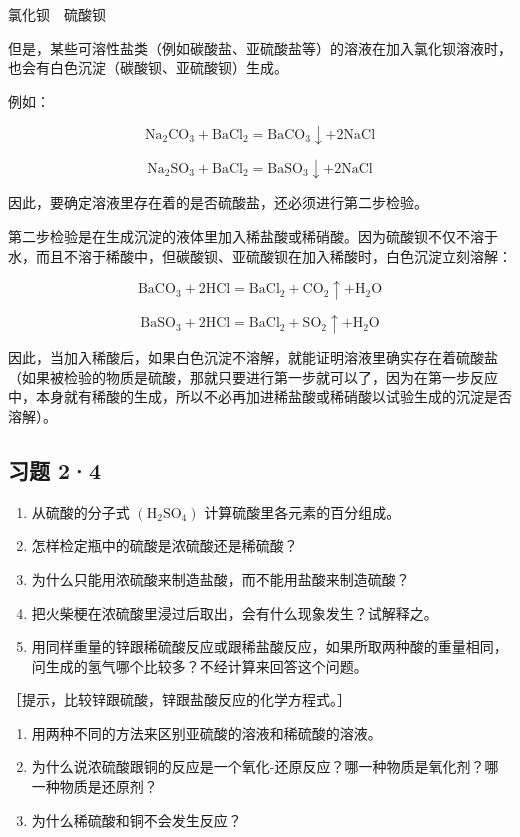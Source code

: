 氯化钡　硫酸钡

但是，某些可溶性盐类（例如碳酸盐、亚硫酸盐等）的溶液在加入氯化钡溶液时，也会有白色沉淀（碳酸钡、亚硫酸钡）生成。

例如：

\[
\mathrm{Na} _ {2} \mathrm{CO} _ {3} + \mathrm{BaCl} _ {2} = \mathrm{BaCO} _ {3} \downarrow + 2 \mathrm{NaCl}
\]

\[
\mathrm{Na} _ {2} \mathrm{SO} _ {3} + \mathrm{BaCl} _ {2} = \mathrm{BaSO} _ {3} \downarrow + 2 \mathrm{NaCl}
\]

因此，要确定溶液里存在着的是否硫酸盐，还必须进行第二步检验。

第二步检验是在生成沉淀的液体里加入稀盐酸或稀硝酸。因为硫酸钡不仅不溶于水，而且不溶于稀酸中，但碳酸钡、亚硫酸钡在加入稀酸时，白色沉淀立刻溶解：

\[
\mathrm{BaCO} _ {3} + 2 \mathrm{HCl} = \mathrm{BaCl} _ {2} + \mathrm{CO} _ {2} \uparrow + \mathrm{H} _ {2} \mathrm{O}
\]

\[
\mathrm{BaSO} _ {3} + 2 \mathrm{HCl} = \mathrm{BaCl} _ {2} + \mathrm{SO} _ {2} \uparrow + \mathrm{H} _ {2} \mathrm{O}
\]

因此，当加入稀酸后，如果白色沉淀不溶解，就能证明溶液里确实存在着硫酸盐（如果被检验的物质是硫酸，那就只要进行第一步就可以了，因为在第一步反应中，本身就有稀酸的生成，所以不必再加进稀盐酸或稀硝酸以试验生成的沉淀是否溶解）。

\subsection{习题 2·4}

\begin{enumerate}
\item
  从硫酸的分子式 \(\left(\mathrm{H}_{2}\mathrm{SO}_{4}\right)\)
  计算硫酸里各元素的百分组成。
\item
  怎样检定瓶中的硫酸是浓硫酸还是稀硫酸？
\item
  为什么只能用浓硫酸来制造盐酸，而不能用盐酸来制造硫酸？
\item
  把火柴梗在浓硫酸里浸过后取出，会有什么现象发生？试解释之。
\item
  用同样重量的锌跟稀硫酸反应或跟稀盐酸反应，如果所取两种酸的重量相同，问生成的氢气哪个比较多？不经计算来回答这个问题。
\end{enumerate}

［提示，比较锌跟硫酸，锌跟盐酸反应的化学方程式。］

\begin{enumerate}[start=6]
\item
  用两种不同的方法来区别亚硫酸的溶液和稀硫酸的溶液。
\item
  为什么说浓硫酸跟铜的反应是一个氧化-还原反应？哪一种物质是氧化剂？哪一种物质是还原剂？
\item
  为什么稀硫酸和铜不会发生反应？
\end{enumerate}

